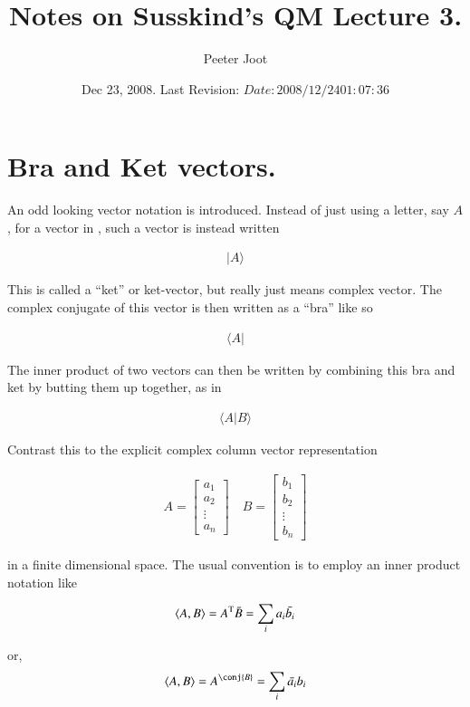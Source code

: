 \documentclass{article}
\title{ Notes on Susskind's QM Lecture 3. }
\author{Peeter Joot}
\date{ Dec 23, 2008.  Last Revision: $Date: 2008/12/24 01:07:36 $ }
\newcommand{\ket}[1]{\lvert {#1} \rangle}
\newcommand{\bra}[1]{\langle {#1} \rvert}
\newcommand{\braket}[2]{\langle{#1} \vert {#2}\rangle}
\begin{document}
\maketitle{}
\section{ Bra and Ket vectors. }

An odd looking vector notation is introduced.  Instead of just using a letter, say $A$, for a vector in , such a
vector is instead written

\begin{align*}
\ket{A}
\end{align*}

This is called a ``ket'' or ket-vector, but really just means complex vector.   The complex conjugate of this
vector is then written as a ``bra'' like so

\begin{align*}
\bra{A}
\end{align*}

The inner product of two vectors can then be written by combining this bra and ket by butting them up together, as
in

\begin{align*}
\braket{A}{B}
\end{align*}

Contrast this to the explicit complex column vector representation

\begin{align*}
{A} = 
\begin{bmatrix}
a_1 \\
a_2 \\
\vdots \\
a_n
\end{bmatrix}
\quad
{B} = 
\begin{bmatrix}
b_1 \\
b_2 \\
\vdots \\
b_n
\end{bmatrix}
\end{align*}

in a finite dimensional space.  The usual convention is to employ an inner product notation like

\begin{align*}
\langle{A}, {B}\rangle = {A}^\text{T} \bar{B} = \sum_i {a_i} \bar{b_i}
\end{align*}

or,
\begin{align*}
\innerprod{A}{B} = {A}^\conj {B} = \sum_i \bar{a_i} {b_i}
\end{align*}
\end{document}
